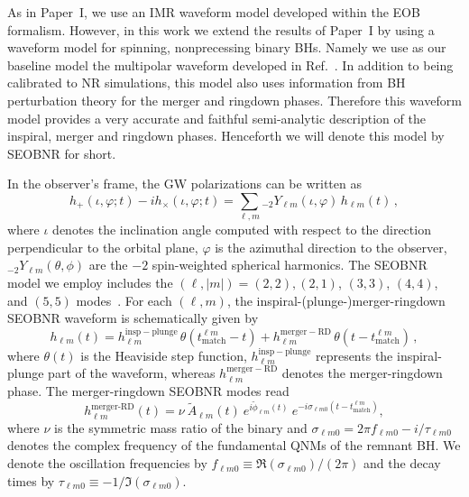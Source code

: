 \documentclass[twocolumn,prd,superscriptaddress,amsfonts,amssymb,amsmath,preprintnumbers]{revtex4-1}
\newcommand{\paperone}{Paper~I\xspace}
\begin{document}
As in \paperone, we use an IMR waveform model developed within the EOB formalism. However, in this work we extend the results of \paperone by using a waveform model for spinning, nonprecessing binary BHs. Namely we use as our baseline model the multipolar waveform developed in Ref.~\citep{Cotesta:2018fcv}. In addition to being calibrated to NR simulations, this model also uses information from BH perturbation theory for the merger and ringdown phases. Therefore this waveform model provides a very accurate and faithful semi-analytic description of the inspiral, merger and ringdown phases. Henceforth we will denote this model by SEOBNR for short.


In the observer's frame, the GW polarizations can be written as 
%
\begin{equation}
h_+(\iota,\varphi;t ) - i h_\times(\iota,\varphi;t) = \sum_{\ell, m} {}_{-\!2}Y_{\ell m}(\iota,\varphi)\, h_{\ell m}(t)\,,
\end{equation}
%
where $\iota$ denotes the inclination angle computed with respect to the direction perpendicular to the orbital plane, $\varphi$ is the azimuthal direction to the observer, ${}_{-\!2}Y_{\ell m}(\theta,\phi)$ are the $-2$ spin-weighted spherical harmonics. The SEOBNR model we employ includes the $(\ell, |m|)=(2,2),(2,1)$, $(3,3)$, $(4,4)$, and $(5,5)$ modes~\cite{Cotesta:2018fcv}. For each $(\ell, m)$, the inspiral-(plunge-)merger-ringdown SEOBNR waveform is schematically given by
%
\begin{equation}
h_{\ell m}(t) = h_{\ell m}^\mathrm{insp-plunge}\, \theta(t_\mathrm{match}^{\ell m} - t) + h_{\ell m}^\mathrm{merger-RD}\,\theta(t-t_\mathrm{match}^{\ell m})\,,
\end{equation}
where $\theta(t)$ is the Heaviside step function, $h_{\ell m}^\mathrm{insp-plunge}$ represents the inspiral-plunge part of the waveform, whereas $h_{\ell m}^\mathrm{merger-RD}$ denotes the merger-ringdown phase.   
The merger-ringdown SEOBNR modes read~\citep{Bohe:2016gbl,Cotesta:2018fcv}
%
\begin{equation}
\label{RD}
h_{\ell m}^{\textrm{merger-RD}}(t) = \nu \ \tilde{A}_{\ell m}(t)\ e^{i \tilde{\phi}_{\ell m}(t)} \ e^{-i \sigma_{\ell m 0}(t-t_{\textrm{match}}^{\ell m})},
\end{equation}
%
where $\nu$ is the symmetric mass ratio of the binary and $\sigma_{\ell m0} = 2\pi f_{\ell m 0} -i/\tau_{\ell m 0}$ denotes the complex frequency of the fundamental QNMs of the remnant BH. We denote the oscillation frequencies by $f_{\ell m  0}\equiv \Re(\sigma_{\ell m0})/(2\pi)$ and the decay times by $\tau_{\ell m 0}\equiv -1/\Im(\sigma_{\ell m0}) $. 
\end{document}

